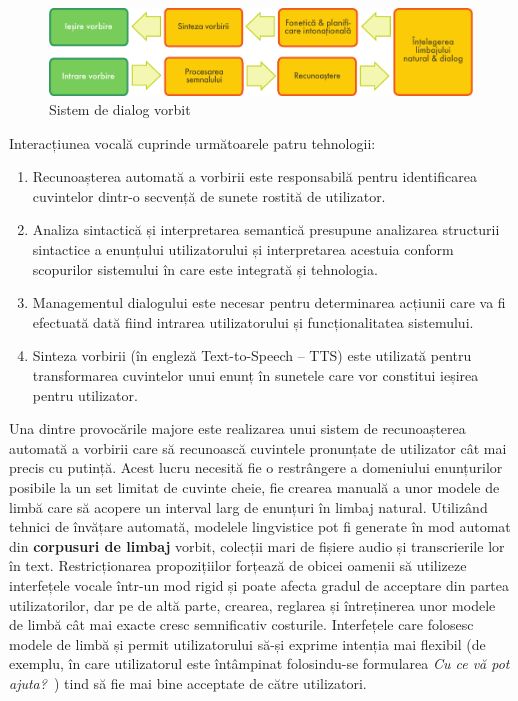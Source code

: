\documentclass[]{../../metanetpaper}
\begin{document}
\begin{multicols}{2}

\begin{figure}[htb]
\center 
\includegraphics[width=\textwidth]{../_media/romanian/simple_speech-based_dialogue_architecture}
\caption{Sistem de dialog vorbit}
\label{fig:dialoguearch_de}
\end{figure}

Interacțiunea vocală cuprinde următoarele patru tehnologii:

\begin{enumerate}
\item Recunoașterea automată a vorbirii este responsabilă pentru identificarea cuvintelor dintr-o secvență de sunete rostită de utilizator.
\item Analiza sintactică și interpretarea semantică presupune analizarea structurii sintactice a enunțului utilizatorului și interpretarea acestuia conform scopurilor sistemului în care este integrată și tehnologia.
\item Managementul dialogului este necesar pentru determinarea acțiunii care va fi efectuată dată fiind intrarea utilizatorului și funcționalitatea sistemului.
\item Sinteza vorbirii (în engleză Text-to-Speech – TTS) este utilizată pentru transformarea cuvintelor unui enunț în sunetele care vor constitui ieșirea pentru utilizator.
\end{enumerate}

Una dintre provocările majore este realizarea unui sistem de recunoașterea automată a vorbirii care să recunoască cuvintele pronunțate de utilizator cât mai precis cu putință. Acest lucru necesită fie o restrângere a domeniului enunțurilor posibile la un set limitat de cuvinte cheie, fie crearea manuală a unor modele de limbă care să acopere un interval larg de enunțuri în limbaj natural. Utilizând tehnici de învățare automată, modelele lingvistice pot fi generate în mod automat din \textbf{corpusuri de limbaj} vorbit, colecții mari de fișiere audio și transcrierile lor în text. Restricționarea propozițiilor forțează de obicei oamenii să utilizeze interfețele vocale într-un mod rigid și poate afecta gradul de acceptare din partea utilizatorilor, dar pe de altă parte, crearea, reglarea și întreținerea unor modele de limbă cât mai exacte cresc semnificativ costurile. Interfețele care folosesc modele de limbă și permit utilizatorului să-și exprime intenția mai flexibil (de exemplu, în care utilizatorul este întâmpinat folosindu-se formularea \textit{Cu ce vă pot ajuta?}~) tind să fie mai bine acceptate de către utilizatori.


\end{multicols}
\end{document}
